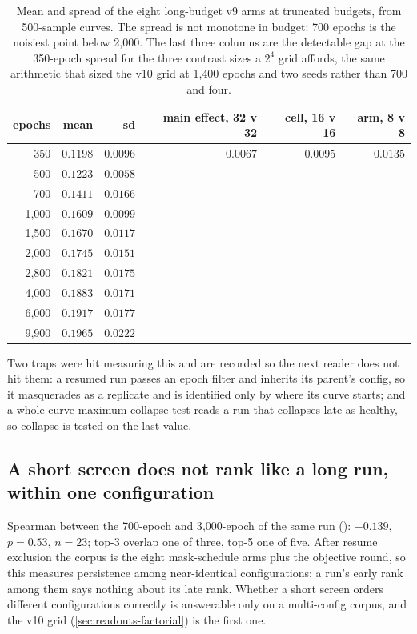 \begin{table}[htbp]
\centering\small
\begin{tabular}{rrrrrr}
\toprule
epochs & mean & sd & main effect, 32 v 32 & cell, 16 v 16 & arm, 8 v 8 \\
\midrule
   350 & $0.1198$ & $0.0096$ & $0.0067$ & $0.0095$ & $0.0135$ \\
   500 & $0.1223$ & $0.0058$ & & & \\
   700 & $0.1411$ & $0.0166$ & & & \\
 1{,}000 & $0.1609$ & $0.0099$ & & & \\
 1{,}500 & $0.1670$ & $0.0117$ & & & \\
 2{,}000 & $0.1745$ & $0.0151$ & & & \\
 2{,}800 & $0.1821$ & $0.0175$ & & & \\
 4{,}000 & $0.1883$ & $0.0171$ & & & \\
 6{,}000 & $0.1917$ & $0.0177$ & & & \\
 9{,}900 & $0.1965$ & $0.0222$ & & & \\
\bottomrule
\end{tabular}
\caption[]{Mean and spread of the eight long-budget v9 arms at truncated budgets, from
500-sample curves. The spread is not monotone in budget: 700 epochs is the noisiest point
below 2{,}000. The last three columns are the detectable gap at the 350-epoch spread for
the three contrast sizes a $2^4$ grid affords, the same arithmetic that sized the v10 grid
at 1{,}400 epochs and two seeds rather than 700 and four.}
\label{tab:findings-power}
\end{table}

Two traps were hit measuring this and are recorded so the next reader does not hit them:
a resumed run passes an epoch filter and inherits its parent's config, so it masquerades
as a replicate and is identified only by where its curve starts; and a whole-curve-maximum
collapse test reads a run that collapses late as healthy, so collapse is tested on the last
value.

\subsection{A short screen does not rank like a long run, within one configuration
}
\label{sec:findings-rank}

Spearman between the 700-epoch and 3{,}000-epoch  of the same run
(): $-0.139$, $p = 0.53$, $n = 23$; top-3 overlap one of
three, top-5 one of five. After resume exclusion the corpus is the eight mask-schedule arms
plus the objective round, so this measures persistence among near-identical
configurations: a run's early rank among them says nothing about its late rank. Whether a
short screen orders
different configurations correctly is answerable only on a multi-config corpus, and the
v10 grid (\cref{sec:readouts-factorial}) is the first one.


